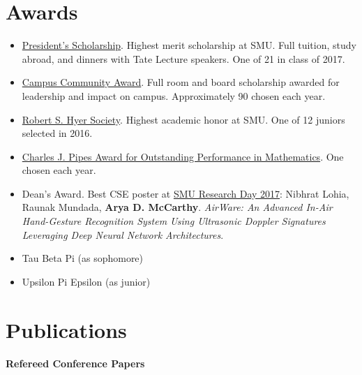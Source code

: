 \documentclass[margin, 10pt]{res} %
\begin{document}
\begin{resume}

\section{Awards}

\begin{itemize}
\item \href{https://www.smu.edu/Academics/PS}{President's Scholarship}. Highest merit scholarship at SMU. Full tuition, study abroad, and dinners with Tate Lecture speakers. One of 21 in class of 2017.
\item \href{https://www.smu.edu/Academics/PS/Benefits}{Campus Community Award}. Full room and board scholarship awarded for leadership and impact on campus. Approximately 90 chosen each year.
\item \href{https://www.smu.edu/EnrollmentServices/Registrar/AcademicCeremonies/HonorsConvocation/HonorSocieties}{Robert S. Hyer Society}. Highest academic honor at SMU. One of 12 juniors selected in 2016.
\item \href{https://www.smu.edu/EnrollmentServices/Registrar/AcademicCeremonies/HonorsConvocation/AwardRecipients}{Charles J. Pipes Award for Outstanding Performance in Mathematics}. One chosen each year.
\item Dean's Award. Best CSE poster at \href{http://www.smu.edu/graduate/CurrentStudents/ResearchDay}{SMU Research Day 2017}: Nibhrat Lohia, Raunak Mundada, \textbf{Arya D. McCarthy}. \emph{AirWare: An Advanced In-Air Hand-Gesture Recognition System Using Ultrasonic Doppler Signatures Leveraging Deep Neural Network Architectures}.
\item Tau Beta Pi (as sophomore)
\item Upsilon Pi Epsilon (as junior)
\end{itemize}


\section{Publications}

\textbf{Refereed Conference Papers}


\end{resume}
\end{document}
